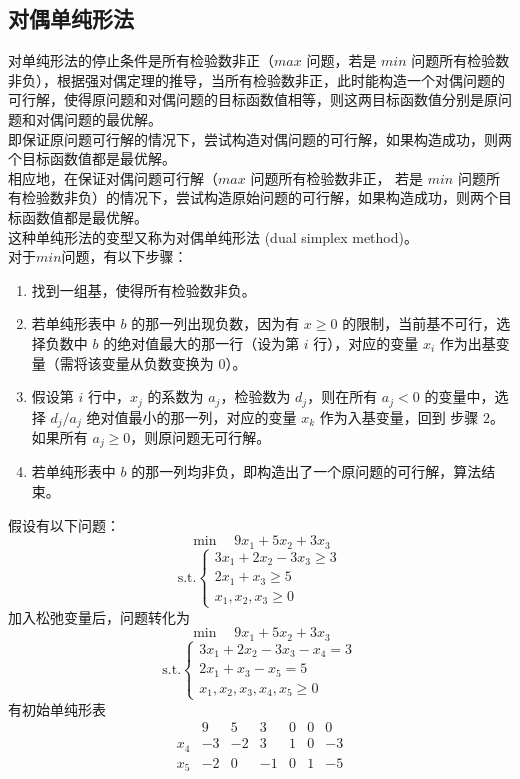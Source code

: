 \subsection{对偶单纯形法}
对单纯形法的停止条件是所有检验数非正（$max$ 问题，若是 $min$ 问题所有检验数非负），根据强对偶定理的推导，当所有检验数非正，此时能构造一个对偶问题的可行解，使得原问题和对偶问题的目标函数值相等，则这两目标函数值分别是原问题和对偶问题的最优解。\\ 
即保证原问题可行解的情况下，尝试构造对偶问题的可行解，如果构造成功，则两个目标函数值都是最优解。 \\
相应地，在保证对偶问题可行解（$max$ 问题所有检验数非正， 若是 $min$ 问题所有检验数非负）的情况下，尝试构造原始问题的可行解，如果构造成功，则两个目标函数值都是最优解。 \\
这种单纯形法的变型又称为对偶单纯形法 (dual simplex method)。 \\
对于$min$问题，有以下步骤：
\begin{enumerate}
    \item 找到一组基，使得所有检验数非负。
    \item 若单纯形表中 $b$ 的那一列出现负数，因为有 $x \ge 0$ 的限制，当前基不可行，选择负数中 $b$ 的绝对值最大的那一行（设为第 $i$ 行），对应的变量 $x_i$ 作为出基变量（需将该变量从负数变换为 0）。
    \item 假设第 $i$ 行中，$x_j$ 的系数为 $a_j$，检验数为 $d_j$，则在所有 $a_j < 0$ 的变量中，选择 $d_j/a_j$ 绝对值最小的那一列，对应的变量 $x_k$ 作为入基变量，回到 步骤 $2$。如果所有 $a_j \ge 0$，则原问题无可行解。
    \item 若单纯形表中 $b$ 的那一列均非负，即构造出了一个原问题的可行解，算法结束。
\end{enumerate}
假设有以下问题：
$$
\min \quad 9x_1 + 5x_2 + 3x_3
$$
$$
\text{s.t.} 
\begin{cases}
    3x_1 + 2x_2 - 3x_3 \ge 3 \\
    2x_1 + x_3 \ge 5 \\
    x_1, x_2, x_3 \ge 0
\end{cases}
$$
加入松弛变量后，问题转化为
$$
\min \quad 9x_1 + 5x_2 + 3x_3
$$
$$
\text{s.t.} 
\begin{cases}
    3x_1 + 2x_2 - 3x_3 - x_4 = 3 \\
    2x_1 + x_3 - x_5 = 5 \\
    x_1, x_2, x_3, x_4, x_5 \ge 0
\end{cases}
$$
有初始单纯形表
$$
\begin{array}{c|ccccc|c} & 9 & 5 & 3 & 0 & 0 & 0 \\ \hline x_4 & -3 & -2 & 3 & 1 & 0 & -3 \\ x_5 & -2 & 0 & -1 & 0 & 1 & -5 \end{array}
$$
